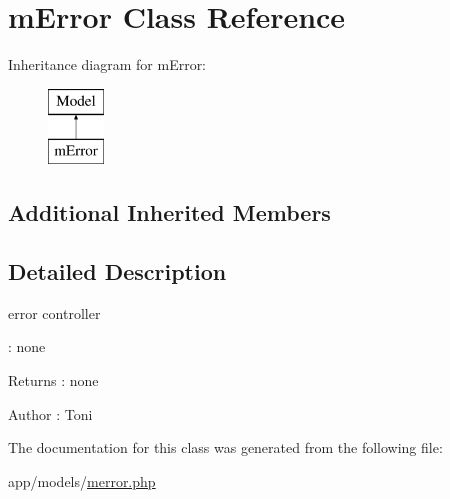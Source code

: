 \hypertarget{classmError}{}\section{m\+Error Class Reference}
\label{classmError}
Inheritance diagram for m\+Error\+:\begin{figure}[H]
\begin{center}
\leavevmode
\includegraphics[height=2.000000cm]{classmError}
\end{center}
\end{figure}
\subsection*{Additional Inherited Members}


\subsection{Detailed Description}
error controller

\+: none \begin{DoxyReturn}{Returns}
\+: none 
\end{DoxyReturn}
\begin{DoxyAuthor}{Author}
\+: Toni 
\end{DoxyAuthor}


The documentation for this class was generated from the following file\+:\begin{DoxyCompactItemize}
\item 
app/models/\hyperlink{merror_8php}{merror.\+php}\end{DoxyCompactItemize}
